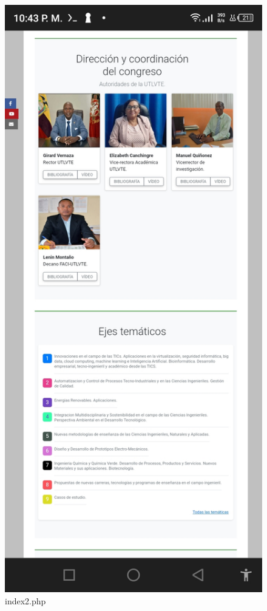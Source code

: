 \documentclass[a4paper,14px]{article}
\begin{document}
\hspace{0.5cm}
        \begin{minipage}[H]{0.45\linewidth}
\begin{figure}[H]
  \centering
  \includegraphics[scale=0.3]{index2.jpg}
  \caption{index2.php }
  \label{fig:arquitectura2}
\end{figure}
  
\end{minipage}
\end{document}
